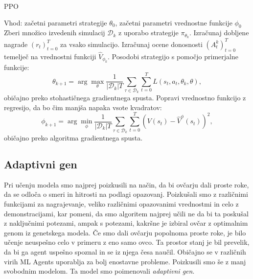 \begin{algorithm}[ht]
	\caption{PPO}
	\label{alg:ppo}
	\begin{algorithmic}[1]
		\State Vhod: začetni parametri strategije $\theta_0$, začetni parametri vrednostne funkcije $\phi_0$
		\State Zberi množico izvedenih simulacij ${\mathcal D}_k$ z uporabo strategije $\pi_{\theta_{k}}$.
		\State Izračunaj dobljene nagrade $(r_t)_{t=0}^T$ za vsako simulacijo.
		\State Izračunaj ocene donosnosti $(A_t^k)_{t=0}^T$ temelječ na vrednostni funkciji $\hat{V}_{\phi_{k}}$.
		\State Posodobi strategijo s pomočjo primerjalne funkcije:
		\begin{equation*}
		\theta_{k+1} = \arg \max_{\theta} \frac{1}{|{\mathcal D}_k| T} \sum_{\tau \in {\mathcal D}_k} \sum_{t=0}^T L(s_t, a_t, \theta_k, \theta),
		\end{equation*}
		običajno preko stohastičnega gradientnega spusta.
		\State Popravi vrednostno funkcijo z regresijo, da bo čim manjša napaka vsote kvadratov:
		\begin{equation*}
		\phi_{k+1} = \arg \min_{\phi} \frac{1}{|{\mathcal D}_k| T} \sum_{\tau \in {\mathcal D}_k} \sum_{t=0}^T (V(s_t) - \hat{V}^\phi(s_t))^2,
		\end{equation*}
		običajno preko algoritma gradientnega spusta.
		\EndFor
	\end{algorithmic}
\end{algorithm}


\subsection{Adaptivni gen}

Pri učenju modela smo najprej poizkusili na način, da bi ovčarju dali proste roke, da se odloča o smeri in hitrosti na podlagi opazovanj. Poizkušali smo z različnimi funkcijami za nagrajevanje, veliko različnimi opazovanimi vrednostmi in celo z demonstracijami, kar pomeni, da smo algoritem najprej učili ne da bi ta poskušal z naključnimi potezami, ampak s potezami, kakršne je izbiral ovčar z optimalnim genom iz genetskega modela. Če smo dali ovčarju popolnoma proste roke, je bilo učenje neuspešno celo v primeru z eno samo ovco. Ta prostor stanj je bil prevelik, da bi ga agent uspešno spoznal in se iz njega česa naučil. Običajno se v različnih virih ML Agents uporablja za bolj enostavne probleme. Poizkusili smo še z manj svobodnim modelom. Ta model smo poimenovali \textit{adaptivni gen}.


